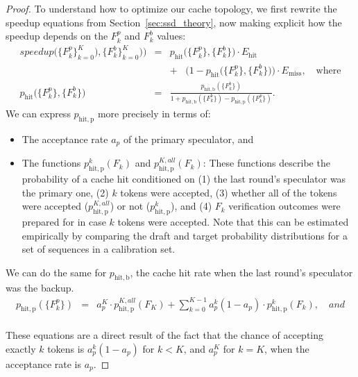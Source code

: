 \begin{proof}


To understand how to optimize our cache topology, we first rewrite the speedup equations from Section~\ref{sec:ssd_theory}, now making explicit how the speedup depends on the $F_k^p$ and $F_k^b$ values:
\begin{eqnarray*}
speedup\Big( \{F_k^p\}_{k=0}^K), \{F_k^b\}_{k=0}^K) \Big) &=& p_{\mathrm{hit}} \Big(\{F_k^p\}, \{F_k^b\}\Big) \cdot E_{\mathrm{hit}} \\
 &\;& + \; \; \;  \bigg(1-p_{\mathrm{hit}} \Big(\{F_k^p\}, \{F_k^b\}\Big)\bigg) \cdot E_{\mathrm{miss}}, \quad \text{where} \\
p_{\mathrm{hit}} \Big(\{F_k^p\}, \{F_k^b\}\Big) &=& \frac{p_{\mathrm{hit,b}}(\{F_k^b\})}{1 + p_{\mathrm{hit,b}}(\{F_k^b\}) - p_{\mathrm{hit,p}}(\{F_k^p\}) }.
\end{eqnarray*}
We can express $p_{\mathrm{hit,p}}$ more precisely in terms of:
\begin{itemize}
    \item The acceptance rate $a_p$ of the primary speculator, and
    \item The functions $p_{\mathrm{hit,p}}^{k}(F_k)$ and $p_{\mathrm{hit,p}}^{K,all}(F_k)$:
    These functions describe the probability of a cache hit conditioned on (1) the last round's speculator was the primary one, (2) $k$ tokens were accepted, (3) whether all of the tokens were accepted ($p_{\mathrm{hit,p}}^{K,all}$) or not ($p_{\mathrm{hit,p}}^{k}$), and (4) $F_k$ verification outcomes were prepared for in case $k$ tokens were accepted.
    Note that this can be estimated empirically by comparing the draft and target probability distributions for a set of sequences in a calibration set.
\end{itemize}
We can do the same for $p_{\mathrm{hit,b}}$, the cache hit rate when the last round's speculator was the backup.
\begin{eqnarray*}
p_{\mathrm{hit,p}}(\{F_k^p\}) &=& a_p^K  \cdot p_{\mathrm{hit,p}}^{K,all}(F_K) + \sum_{k=0}^{K-1} a_p^k (1-a_p) \cdot p_{\mathrm{hit,p}}^{k}(F_k), \quad {and} \\
\end{eqnarray*}

These equations are a direct result of the fact that the chance of accepting exactly $k$ tokens is $a_p^k(1-a_p)$ for $k < K$, and $a_p^K$ for $k=K$, when the acceptance rate is $a_p$.


\end{proof}
